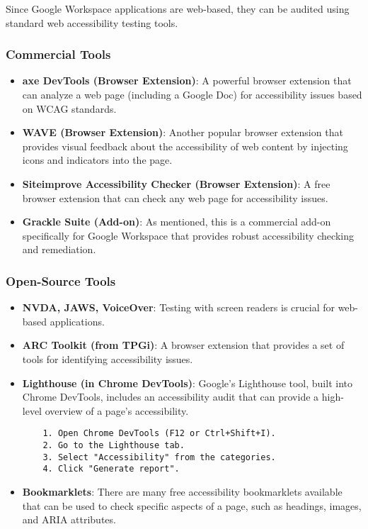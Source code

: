 Since Google Workspace applications are web-based, they can be audited using standard web accessibility testing tools.

\subsubsection{Commercial Tools}
\label{ssubsec:commercial-web-tools}
\begin{itemize}
	\item \textbf{axe DevTools (Browser Extension)}: A powerful browser extension that can analyze a web page (including a Google Doc) for accessibility issues based on WCAG standards.
	\item \textbf{WAVE (Browser Extension)}: Another popular browser extension that provides visual feedback about the accessibility of web content by injecting icons and indicators into the page.
	\item \textbf{Siteimprove Accessibility Checker (Browser Extension)}: A free browser extension that can check any web page for accessibility issues.
	\item \textbf{Grackle Suite (Add-on)}: As mentioned, this is a commercial add-on specifically for Google Workspace that provides robust accessibility checking and remediation.
\end{itemize}

\subsubsection{Open-Source Tools}
\label{ssubsec:opensource-web-tools}
\begin{itemize}
	\item \textbf{NVDA, JAWS, VoiceOver}: Testing with screen readers is crucial for web-based applications.
	\item \textbf{ARC Toolkit (from TPGi)}: A browser extension that provides a set of tools for identifying accessibility issues.
	\item \textbf{Lighthouse (in Chrome DevTools)}: Google's Lighthouse tool, built into Chrome DevTools, includes an accessibility audit that can provide a high-level overview of a page's accessibility.
	      \begin{verbatim}
    1. Open Chrome DevTools (F12 or Ctrl+Shift+I).
    2. Go to the Lighthouse tab.
    3. Select "Accessibility" from the categories.
    4. Click "Generate report".
    \end{verbatim}
	\item \textbf{Bookmarklets}: There are many free accessibility bookmarklets available that can be used to check specific aspects of a page, such as headings, images, and ARIA attributes.
\end{itemize}

